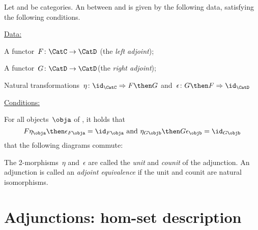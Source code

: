 \begin{ctdefinition}
  \label{def:cat-adjunction}
  Let \CatC and \CatD be categories. An \emph{} between \CatC and \CatD is given by the following data, satisfying the following conditions.

  \underline{Data:}
  \begin{compactenum}
    \item A functor~$F\colon \CatC \to \CatD$ (the \emph{left adjoint});
    \item A functor~$G\colon \CatD \to \CatD$(the \emph{right adjoint});
    \item Natural transformations~$\eta \colon \id_\CatC \Rightarrow F \then G$ and~$\epsilon \colon G \then F \Rightarrow \id_\CatD$
  \end{compactenum}

  \underline{Conditions:}
  \begin{compactenum}
    \item For all objects~$\obja$ of \CatC, it holds that
    \begin{equation*}
      F\eta_\obja \then \epsilon_{F\obja} = \id_{F\obja} \text{ and }  \eta_{G\objb} \then G\epsilon_\objb = \id_{G\objb}
    \end{equation*}
     that the following diagrams commute:

\begin{center}
\end{center}
  \end{compactenum}
  The 2-morphisms~$\eta$ and~$\epsilon$ are called the \emph{unit} and \emph{counit} of the adjunction.
  An adjunction is called an \emph{adjoint equivalence} if the unit and counit are natural isomorphisms.
\end{ctdefinition}


\section{Adjunctions: hom-set description}
